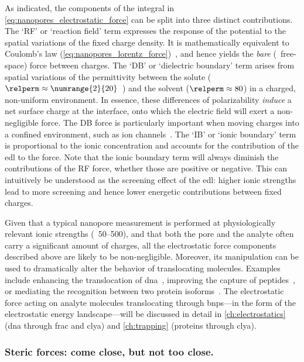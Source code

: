 %
As indicated, the components of the integral in \cref{eq:nanopores_electrostatic_force} can be split into
three distinct contributions. The `RF' or `reaction field' term expresses the response of the potential to the
spatial variations of the fixed charge density. It is mathematically equivalent to Coulomb's law
(\cref{eq:nanopores_lorentz_force})~\cite{Im-1998}, and hence yields the \emph{bare} (\ie~free-space) force
between charges. The `DB' or `dielectric boundary' term arises from spatial variations of the permittivity
between the solute ($\relperm \approx \text{\numrange{2}{20}}$~\cite{Li-2013}) and the solvent ($\relperm
\approx 80$) in a charged, non-uniform environment. In essence, these differences of polarizability
\emph{induce} a net surface charge at the interface, onto which the electric field will exert a non-negligible
force. The DB force is particularly important when moving charges into a confined environment, such as ion
channels~\cite{Nadler-2003}. The `IB' or `ionic boundary' term is proportional to the ionic concentration and
accounts for the contribution of the \gls{edl} to the force. Note that the ionic boundary term will always
diminish the contributions of the RF force, whether those are positive or negative. This can intuitively be
understood as the screening effect of the \gls{edl}: higher ionic strengths lead to more screening and hence
lower energetic contributions between fixed charges.

Given that a typical nanopore measurement is performed at physiologically relevant ionic strengths
(\eg~\SIrange{50}{500}{\mM}), and that both the pore and the analyte often carry a significant amount of
charges, all the electrostatic force components described above are likely to be non-negligible. Moreover, its
manipulation can be used to dramatically alter the behavior of translocating molecules. Examples include
enhancing the translocation of \gls{dna}~\cite{Maglia-2008}, improving the capture of
peptides~\cite{Asandei-2015b,Asandei-2016}, or mediating the recognition between two protein
isoforms~\cite{Fahie-2015b}. The electrostatic force acting on analyte molecules translocating through
\glspl{bnp}---in the form of the electrostatic energy landscape---will be discussed in detail in
\cref{ch:electrostatics} (\gls{dna} through \gls{frac} and \gls{clya}) and \cref{ch:trapping} (proteins
through \gls{clya}).


\subsubsection{Steric forces: come close, but not too close.}
%


